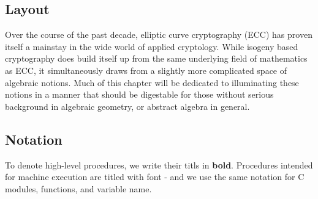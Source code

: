 \subsection{Layout}

Over the course of the past decade, elliptic curve cryptography (ECC) has proven itself a mainstay in the wide world of applied cryptology. While isogeny based cryptography does build itself up from the same underlying field of mathematics as ECC, it simultaneously draws from a slightly more complicated space of algebraic notions. Much of this chapter will be dedicated to illuminating these notions in a manner that should be digestable for those without serious background in algebraic geometry, or abstract algebra in general.

\subsection{Notation}

To denote high-level procedures, we write their titls in \textbf{bold}. Procedures intended for machine execution are titled with  font - and we use the same notation for C modules, functions, and variable name. 